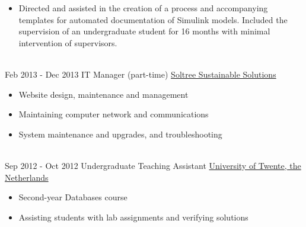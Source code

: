 \documentclass[letterpaper]{twentysecondcv} %
\begin{document}
\begin{twenty}
{\begin{itemize}
    several large FCA Simulink models.
    \item Directed and assisted in the creation of a process and accompanying
    templates for automated documentation of Simulink models. Included the
    supervision of an undergraduate student for 16 months with minimal
    intervention of supervisors.
  \end{itemize}}
  \\
\twentyitem
  {Feb 2013 -}
  {Dec 2013}
  {IT Manager (part-time)}
  {\href{http://www.soltree.net/}{Soltree Sustainable Solutions}}
  {}
  {\begin{itemize}
      \item Website design, maintenance and management
      \item Maintaining computer network and communications
      \item System maintenance and upgrades, and troubleshooting
  \end{itemize}}
\\
\twentyitem
{Sep 2012 -}
{Oct 2012}
{Undergraduate Teaching Assistant}
{\href{https://www.utwente.nl/}{University of Twente, the Netherlands}}
{}
{\begin{itemize}
    \item Second-year Databases course
    \item Assisting students with lab assignments and verifying solutions
\end{itemize}}

\end{twenty}
\end{document}
